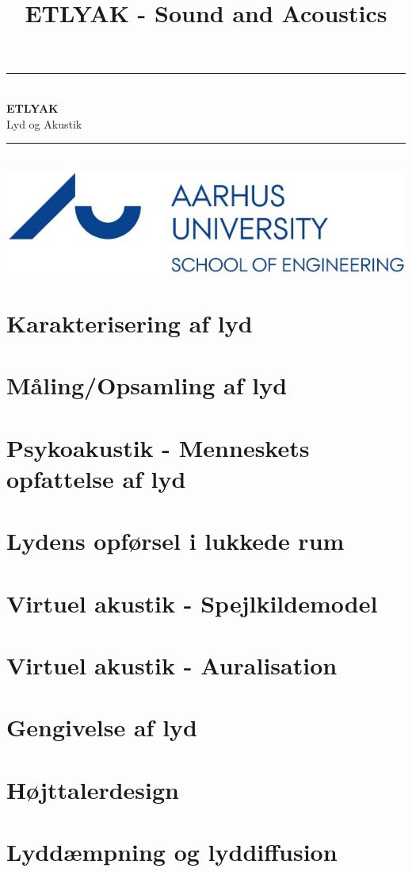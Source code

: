 \documentclass[12pt,a4paper,danish,oneside]{book}
\title{ETLYAK - Sound and Acoustics}
\newcommand{\HRule}{\rule{\linewidth}{0.5mm}}
\begin{document}
\begin{titlepage}
	\clearpage\thispagestyle{empty}

	\begin{center}
		\HRule \\[0.4cm]
		{\huge \bfseries ETLYAK} \\[.3cm] {\huge Lyd og Akustik}\\[0cm]		
		\HRule \\[3.4cm]
		\includegraphics[width=0.5\linewidth]{graphics/au}
	\end{center}
	\renewcommand{\contentsname}{Indholdsfortegnelse}
	\tableofcontents

\end{titlepage}
 
\listoffixmes

\chapter{Karakterisering af lyd}


\chapter{Måling/Opsamling af lyd}


\chapter{Psykoakustik - Menneskets opfattelse af lyd}


\chapter{Lydens opførsel i lukkede rum}


\chapter{Virtuel akustik - Spejlkildemodel}


\chapter{Virtuel akustik - Auralisation}


\chapter{Gengivelse af lyd}


\chapter{Højttalerdesign}


\chapter{Lyddæmpning og lyddiffusion}
\end{document}
